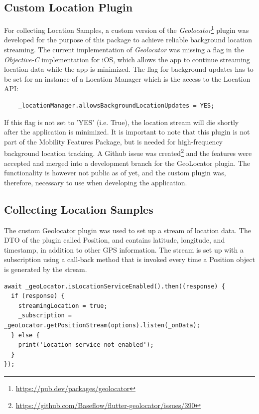 \subsection{Custom Location Plugin}
For collecting Location Samples, a custom version of the \textit{Geolocator}\footnote{\url{https://pub.dev/packages/geolocator}} plugin was developed for the purpose of this package to achieve reliable background location streaming. The current implementation of \textit{Geolocator} was missing a flag in the \textit{Objective-C} implementation for iOS, which allows the app to continue streaming location data while the app is minimized. The flag for background updates has to be set for an instance of a Location Manager which is the access to the Location API:

\begin{verbatim}
    _locationManager.allowsBackgroundLocationUpdates = YES;
\end{verbatim}

If this flag is not set to 'YES' (i.e. True), the location stream will die shortly after the application is minimized. It is important to note that this plugin is not part of the Mobility Features Package, but is needed for high-frequency background location tracking. A Github issue was created\footnote{\url{https://github.com/Baseflow/flutter-geolocator/issues/390}} and the features were accepted and merged into a development branch for the GeoLocator plugin. The functionality is however not public as of yet, and the custom plugin was, therefore, necessary to use when developing the application. 

\subsection{Collecting Location Samples}
The custom Geolocator plugin was used to set up a stream of location data. The DTO of the plugin called Position, and contains latitude, longitude, and timestamp, in addition to other GPS information. The stream is set up with a subscription using a call-back method that is invoked every time a Position object is generated by the stream. 

\begin{verbatim}
await _geoLocator.isLocationServiceEnabled().then((response) {
  if (response) {
    streamingLocation = true;
    _subscription = _geoLocator.getPositionStream(options).listen(_onData);
  } else {
    print('Location service not enabled');
  }
});
\end{verbatim}

